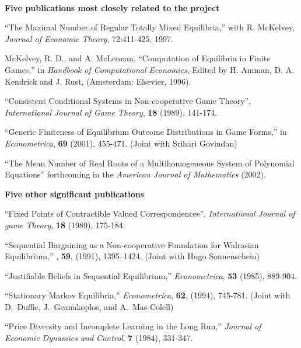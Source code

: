 \documentclass[12pt]{article}
\begin{document}
\ \\
\noindent
{\bf Five publications most closely related to the project}
\begin{description}

\item
``The Maximal Number of Regular Totally Mixed Equilibria,'' with
R. McKelvey, {\it Journal of Economic Theory}, 72:411-425, 1997.

\item
McKelvey, R. D., and A. McLennan, ``Computation of Equilibria in
Finite Games,'' in {\it Handbook of Computational
Economics}, Edited by H. Amman, D. A. Kendrick and J. Rust,
(Amsterdam: Elsevier, 1996).

\item
``Consistent Conditional Systems in
Non-cooperative Game Theory'', {\it International Journal of Game
Theory}, {\bf 18} (1989), 141-174.

\item
``Generic Finiteness of Equilibrium Outcome Distributions in Game
Forms,'' in {\it Econometrica}, {\bf 69} (2001), 455-471. (Joint with
Srihari Govindan)

\item
``The Mean Number of Real Roots of a Multihomogeneous System of
Polynomial Equations'' forthcoming in the {\it American Journal of
Mathematics} (2002).




\end{description}

\noindent
{\bf Five other significant publications}
\begin{description}
\item
``Fixed Points of Contractible Valued
Correspondences'', {\it International Journal of game Theory},
{\bf 18} (1989), 175-184.

\item
``Sequential Bargaining as a Non-cooperative
Foundation for Walrasian Equilibrium,'' ,
{\bf 59}, (1991), 1395--1424.  (Joint with Hugo Sonnenschein)


\item
``Justifiable Beliefs in Sequential Equilibrium,'' {\it
Econometrica}, {\bf 53} (1985), 889-904.

\item
``Stationary Markov Equilibria,'' {\it Econometrica}, {\bf 62},
(1994), 745-781.  (Joint with D.~Duffie, J.~Geanakoplos, and
A.~Mas-Colell)

\item
``Price Diversity and Incomplete Learning in the Long Run,'' {\it Journal
of Economic Dynamics and Control}, {\bf 7} (1984), 331-347.


\end{description}
\end{document}
